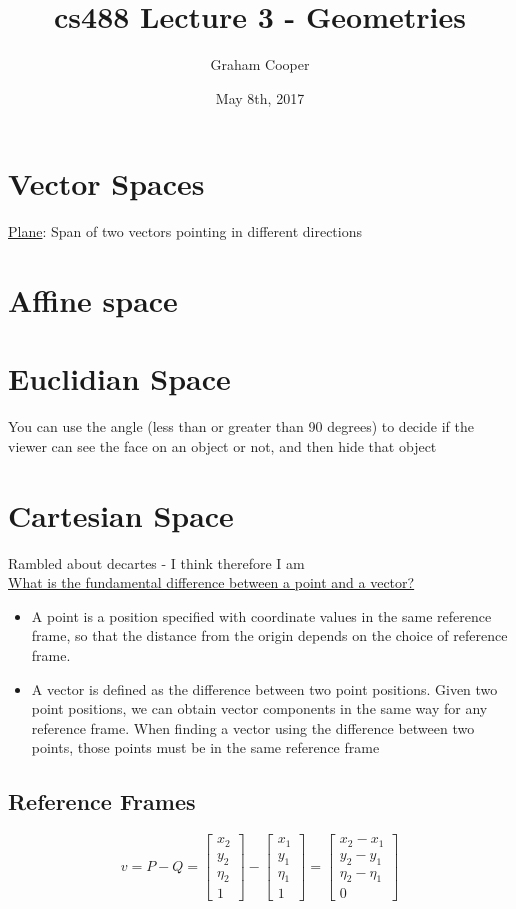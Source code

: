 \documentclass[12pt]{article}
\title{\vspace{-15ex}cs488 Lecture 3 - Geometries\vspace{-1ex}}
\date{May 8th, 2017}
\author{Graham Cooper}
\begin{document}
	\maketitle
	
	\section*{Vector Spaces}
	\underline{Plane}: Span of two vectors pointing in different directions\\
	\section*{Affine space}
	\section*{Euclidian Space}
	You can use the angle (less than or greater than 90 degrees) to decide if the viewer can see the face on an object or not, and then hide that object\\
	
	\section*{Cartesian Space}
	Rambled about decartes - I think therefore I am\\
	
	\underline{What is the fundamental difference between a point and a vector?}\\
	\begin{itemize}
		\item A point is a position specified with coordinate values in the same reference frame, so that the  distance from the origin depends on the choice of reference frame.
		\item A vector is defined as the difference between two point positions. Given two point positions, we can obtain vector components in the same way for any reference frame. When finding a vector using the difference between two points, those points must be in the same reference frame
	\end{itemize}

	\subsection*{Reference Frames}

	$$v = P-Q = \begin{bmatrix} x_2 \\ y_2 \\ \eta_2 \\ 1 \end{bmatrix} - \begin{bmatrix} x_1 \\ y_1 \\ \eta_1 \\ 1 \end{bmatrix} = \begin{bmatrix} x_2 - x_1 \\ y_2 - y_1 \\ \eta_2 - \eta_1 \\ 0 \end{bmatrix}$$
	
\end{document}
